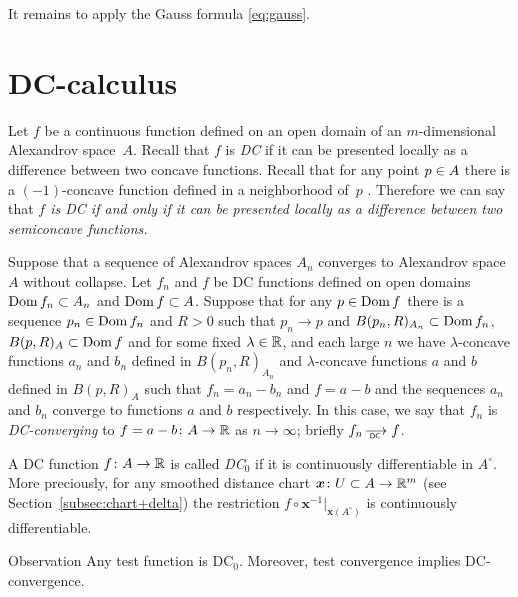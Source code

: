 It remains to apply the Gauss formula \ref{eq:gauss}.
\qeds




 
 
 
 

  
 
\section{DC-calculus}\label{sec:DC}

Let $f$ be a continuous function defined on an open domain of an $m$-dimensional Alexandrov space~$A$.
Recall that $f$ is \emph{DC} if it can be presented locally as a difference between two concave functions.
Recall that for any point $p\zz\in A$ there is a $(-1)$-concave function defined in a  neighborhood  of~$p$ \cite[3.6]{PerMorse}.
Therefore we can say that \textit{$f$ is DC if and only if it can be presented locally as a difference between two semiconcave functions.} 

Suppose that a sequence of Alexandrov spaces $A_n$ converges to Alexandrov space $A$ without collapse.
Let $f_n$ and $f$ be DC functions defined on open domains $\Dom f_n\zz\subset A_n$ and $\Dom f \zz\subset A$.
Suppose that for any $p\in \mathop{\rm Dom} f$ there is a sequence $p_n\in \mathop{\rm Dom} f_n$ and $R>0$ such that $p_n\to p$ and $B(p_n,R)_{A_n}\subset \mathop{\rm Dom} f_n$, $B(p,R)_{A}\subset\mathop{\rm Dom} f$
and for some fixed $\lambda\in\mathbb{R}$, and each large $n$ we have $\lambda$-concave functions $a_n$ and $b_n$ defined in $B(p_n,R)_{A_n}$ and $\lambda$-concave functions $a$ and $b$ defined in $B(p,R)_{A}$
such that $f_n=a_n-b_n$ and $f=a-b$ and the sequences
$a_n$ and $b_n$ converge to functions $a$ and $b$ respectively.
In this case, we say that $f_n$ is \emph{DC-converging} to $f=a-b\colon A\to \mathbb{R}$ as $n\to\infty$; briefly $f_n\DCto f$.

A DC function $f\colon A\to \mathbb{R}$ is called \emph{DC$_0$} if it is continuously differentiable in $A^\circ$.
More preciously, for any smoothed distance chart $\bm{x}\colon U\subset A \to \mathbb{R}^m$ (see Section~\ref{subsec:chart+delta}) the restriction $f\circ\bm{x}^{-1}|_{\bm{x}(A^\circ)}$ is continuously differentiable.

{\sloppy

\begin{thm}{Observation}\label{obs:test-DC}
Any test function is DC$_0$.
Moreover, test convergence implies DC-convergence. 
\end{thm}

}

